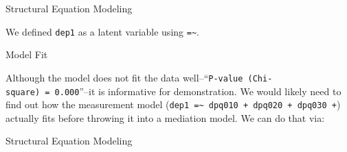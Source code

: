 \begin{frame}[fragile]{Structural Equation Modeling}

We defined \texttt{dep1} as a latent variable using
\texttt{=\textasciitilde{}}.

\begin{block}{Model Fit}

Although the model does not fit the data
well--``\texttt{P-value\ (Chi-square)\ =\ 0.000}''--it is informative
for demonstration. We would likely need to find out how the measurement
model
(\texttt{dep1\ =\textasciitilde{}\ dpq010\ +\ dpq020\ +\ dpq030\ +})
actually fits before throwing it into a mediation model. We can do that
via:

\end{block}

\end{frame}

\begin{frame}[fragile]{Structural Equation Modeling}

\scriptsize

\begin{Shaded}
\begin{Highlighting}[]
\StringTok{ }
\end{Highlighting}
\end{Shaded}

\end{frame}

